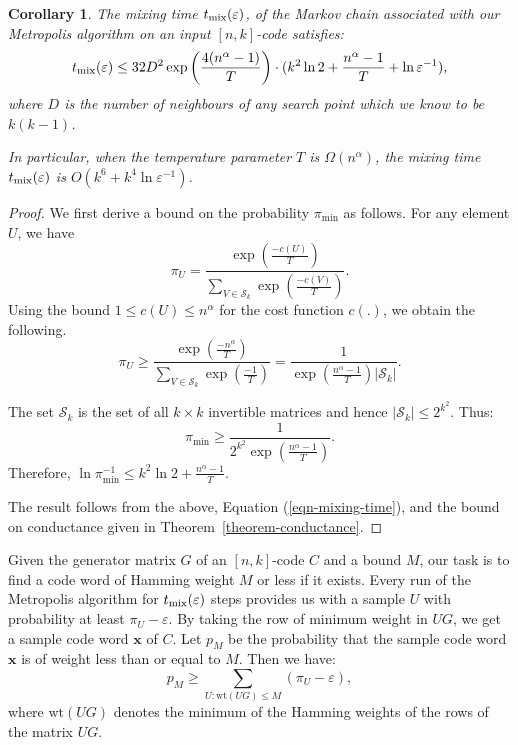 \documentclass{sig-alternate-2013}
\newtheorem{corollary}[theorem]{Corollary}
\begin{document}
\begin{corollary}
  \label{tmixo}
  The mixing time $t_{\mathrm{mix}}(\varepsilon)$, of the Markov chain associated with our
  Metropolis algorithm on an input $[n,k]$-code satisfies:
  \[
  t_{\mathrm{mix}}(\varepsilon) 
  \leq 32D^{2}\exp{\left(\frac{4(n^\alpha-1)}{T}\right)}
  \cdot (k^2 \ln2 + \frac{n^\alpha-1}{T} + \ln \varepsilon^{-1}),
  \]
  where $D$ is the number of neighbours of any search point which we
  know to be $k(k-1)$.  

  In particular, when the temperature parameter $T$ is $\Omega(n^\alpha)$,
  the mixing time $t_{\mathrm{mix}}(\varepsilon)$ is $O(k^6 + k^4 \ln \varepsilon^{-1})$.
\end{corollary}
\begin{proof}
  We first derive a bound on the probability $\pi_{\min}$ as follows.
  For any element $U$, we have
  \begin{displaymath}
    \pi_U = \frac{\exp\left({\frac{-c(U)}{T}}\right)}{\sum_{V \in \mathcal{S}_k}\exp\left({\frac{-c(V)}{T}}\right)}.
  \end{displaymath}
  Using the bound $ 1 \leq c(U) \leq n^{\alpha}$ for the cost function
  $c(.)$, we obtain the following.
  \begin{displaymath}
    \pi_U 
    \geq \frac{\exp{\left(\frac{-n^\alpha}{T}\right)}}
    {\sum_{V \in \mathcal{S}_{k}}\exp\left({\frac{-1}{T}}\right)} 
    = \frac{1}{\exp\left({\frac{n^\alpha-1}{T}}\right)| \mathcal{S}_k|}.
  \end{displaymath}

  The set $\mathcal{S}_k$ is the set of all $k\times k$ invertible
  matrices and hence $|\mathcal{S}_k| \leq 2^{k^2}$. Thus:
  \begin{equation}\label{eqn-pi-min}
    \pi_{\min} \geq \frac{1}{2^{k^2}\exp\left({\frac{n^\alpha-1}{T}}\right)}.
  \end{equation}
  Therefore, $\ln \pi_{\min}^{-1} \leq k^2 \ln2 +
  \frac{n^\alpha-1}{T}$.

  The result follows from the above, Equation (\ref{eqn-mixing-time}),
  and the bound on conductance given in
  Theorem~\ref{theorem-conductance}.
\end{proof}

Given the generator matrix $G$ of an $[n,k]$-code $C$ and a bound $M$,
our task is to find a code word of Hamming weight $M$ or less if it
exists. Every run of the Metropolis algorithm for $t_{\mathrm{mix}}(\varepsilon)$ steps
provides us with a sample $U$ with probability at least $\pi_U -
\varepsilon$. By taking the row of minimum weight in $UG$, we get a
sample code word $\mathbf{x}$ of $C$. Let $p_M$ be the probability
that the sample code word $\mathbf{x}$ is of weight less than or equal
to $M$. Then we have:
\[
p_M \geq \sum_{U: \mathrm{wt}(UG) \leq M} (\pi_U - \varepsilon),
\]
where $\mathrm{wt}(UG)$ denotes the minimum of the Hamming weights of
the rows of the matrix $UG$.
\end{document}
